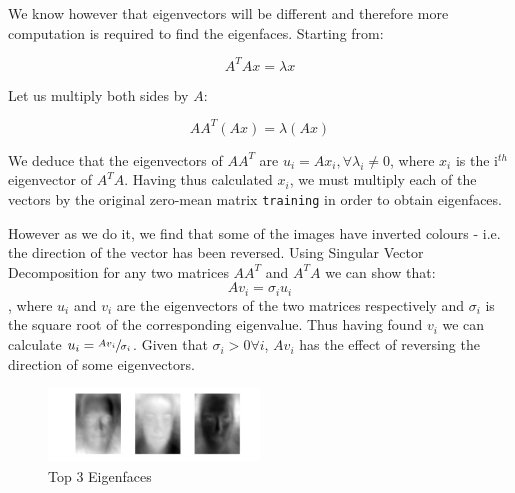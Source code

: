 \documentclass[10pt,twocolumn,letterpaper]{article}
\begin{document}
We know however that eigenvectors will be different and therefore more computation is required to find the eigenfaces. Starting from:

\begin{equation}
A^TAx = \lambda x
\end{equation}

Let us multiply both sides by $A$:

\begin{equation}
AA^T(Ax) = \lambda (Ax)
\end{equation}

We deduce that the eigenvectors of $AA^T$ are $u_i = Ax_i, \forall \lambda_i \neq 0$, where $x_i$ is the i$^{th}$ eigenvector of $A^TA$. Having thus calculated $x_i$, we must multiply each of the vectors by the original zero-mean matrix {\tt\small training} in order to obtain eigenfaces.

However as we do it, we find that some of the images have inverted colours - i.e. the direction of the vector has been reversed. Using Singular Vector Decomposition for any two matrices $AA^T$ and $A^TA$ we can show that:
\begin{equation}
Av_i = \sigma_i u_i
\end{equation}
, where $u_i$ and $v_i$ are the eigenvectors of the two matrices respectively and $\sigma_i$ is the square root of the corresponding eigenvalue. Thus having found $v_i$ we can calculate $u_i = \sfrac{Av_i}{\sigma_i}$. Given that $\sigma_i > 0  \forall i$, $Av_i$ has the effect of reversing the direction of some eigenvectors.

\begin{figure}[H]
\centering
\includegraphics[width=0.5\textwidth]{../results/Q1B_PCA_Eigenfaces}

  \caption{Top 3 Eigenfaces \label{fig:Eig4}}

\end{figure}
\end{document}
